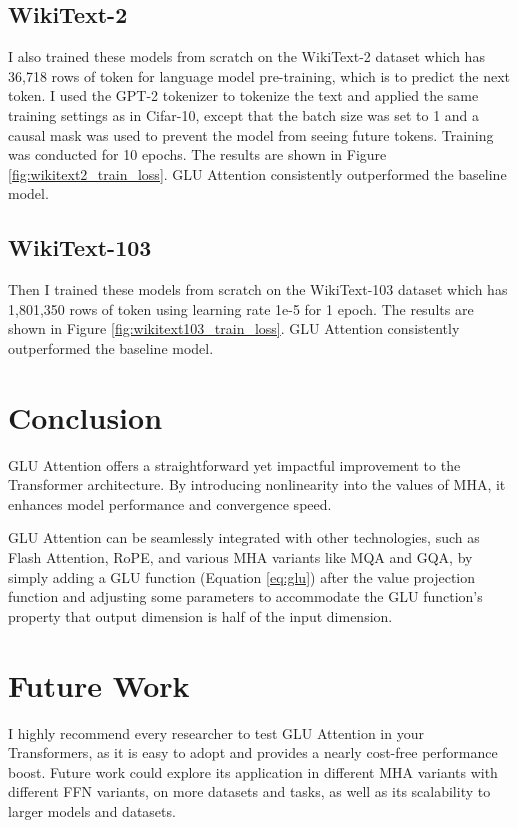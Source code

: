 \documentclass[11pt]{article}
\begin{document}
\subsection{WikiText-2}



I also trained these models from scratch on the WikiText-2 dataset which has 36,718 rows of token for language model pre-training, which is to predict the next token. I used the GPT-2 tokenizer to tokenize the text and applied the same training settings as in Cifar-10, except that the batch size was set to 1 and a causal mask was used to prevent the model from seeing future tokens. Training was conducted for 10 epochs. The results are shown in Figure \ref{fig:wikitext2_train_loss}. GLU Attention consistently outperformed the baseline model.

\subsection{WikiText-103}

Then I trained these models from scratch on the WikiText-103 dataset which has 1,801,350 rows of token using learning rate 1e-5 for 1 epoch. The results are shown in Figure \ref{fig:wikitext103_train_loss}. GLU Attention consistently outperformed the baseline model.

\section{Conclusion}

GLU Attention offers a straightforward yet impactful improvement to the Transformer architecture. By introducing nonlinearity into the values of MHA, it enhances model performance and convergence speed.

GLU Attention can be seamlessly integrated with other technologies, such as Flash Attention\cite{dao2022flashattentionfastmemoryefficientexact}, RoPE\cite{su2023roformerenhancedtransformerrotary}, and various MHA variants like MQA and GQA\cite{ainslie2023gqatraininggeneralizedmultiquery}, by simply adding a GLU function (Equation \ref{eq:glu}) after the value projection function and adjusting some parameters to accommodate the GLU function's property that output dimension is half of the input dimension.

\section{Future Work}
I highly recommend every researcher to test GLU Attention in your Transformers, as it is easy to adopt and provides a nearly cost-free performance boost. Future work could explore its application in different MHA variants with different FFN variants, on more datasets and tasks, as well as its scalability to larger models and datasets.



\end{document}
